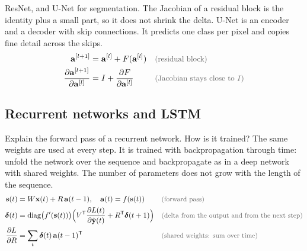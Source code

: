 \begin{qabox}{ResNet, and U-Net for segmentation.}
\explain The Jacobian of a residual block is the identity plus a small part, so it does not shrink
the delta. U-Net is an encoder and a decoder with skip connections. It predicts one class per pixel
and copies fine detail across the skips.
\derive
\begin{align*}
\mathbf{a}^{[l+1]} &= \mathbf{a}^{[l]} + F(\mathbf{a}^{[l]}) \why{residual block} \\
\frac{\partial\mathbf{a}^{[l+1]}}{\partial\mathbf{a}^{[l]}} &= I + \frac{\partial F}{\partial\mathbf{a}^{[l]}} \why{Jacobian stays close to $I$}
\end{align*}
\end{qabox}

\subsection{Recurrent networks and LSTM}

\begin{qabox}{Explain the forward pass of a recurrent network. How is it trained?}
\explain The same weights are used at every step. It is trained with backpropagation through time:
unfold the network over the sequence and backpropagate as in a deep network with shared weights.
The number of parameters does not grow with the length of the sequence.
\derive
\begin{align*}
\mathbf{s}(t) &= W\mathbf{x}(t) + R\,\mathbf{a}(t-1),\quad \mathbf{a}(t) = f(\mathbf{s}(t)) \why{forward pass} \\
\bm\delta(t) &= \mathrm{diag}\bigl(f'(\mathbf{s}(t))\bigr)\Bigl(V^{\mathsf{T}}\frac{\partial L(t)}{\partial\hat{\mathbf{y}}(t)} + R^{\mathsf{T}}\bm\delta(t+1)\Bigr) \why{delta from the output and from the next step} \\
\frac{\partial L}{\partial R} &= \sum_t \bm\delta(t)\,\mathbf{a}(t-1)^{\mathsf{T}} \why{shared weights: sum over time}
\end{align*}
\end{qabox}


